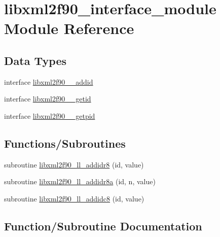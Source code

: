 \hypertarget{namespacelibxml2f90__interface__module}{}\section{libxml2f90\+\_\+interface\+\_\+module Module Reference}
\label{namespacelibxml2f90__interface__module}
\subsection*{Data Types}
\begin{DoxyCompactItemize}
\item 
interface \hyperlink{interfacelibxml2f90__interface__module_1_1libxml2f90____addid}{libxml2f90\+\_\+\+\_\+addid}
\item 
interface \hyperlink{interfacelibxml2f90__interface__module_1_1libxml2f90____getid}{libxml2f90\+\_\+\+\_\+getid}
\item 
interface \hyperlink{interfacelibxml2f90__interface__module_1_1libxml2f90____getpid}{libxml2f90\+\_\+\+\_\+getpid}
\end{DoxyCompactItemize}
\subsection*{Functions/\+Subroutines}
\begin{DoxyCompactItemize}
\item 
subroutine \hyperlink{namespacelibxml2f90__interface__module_a74e6744ce3a60bdf75d94db9e9683fa8}{libxml2f90\+\_\+ll\+\_\+addidr8} (id, value)
\item 
subroutine \hyperlink{namespacelibxml2f90__interface__module_a2532faf7ac758a77d95784b4bf95e13d}{libxml2f90\+\_\+ll\+\_\+addidr8a} (id, n, value)
\item 
subroutine \hyperlink{namespacelibxml2f90__interface__module_a3bfde8cab194dab3ca706c4363bd4cf2}{libxml2f90\+\_\+ll\+\_\+addidc8} (id, value)
\end{DoxyCompactItemize}


\subsection{Function/\+Subroutine Documentation}
